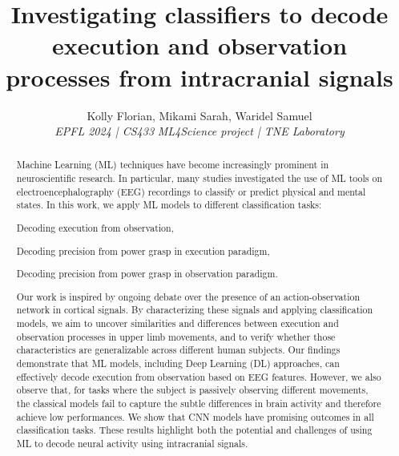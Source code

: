 \documentclass[10pt,conference,compsocconf]{IEEEtran}
\begin{document}
\title{Investigating classifiers to decode execution and observation processes from intracranial signals}

\author{
  Kolly Florian, Mikami Sarah, Waridel Samuel \\
  \textit{EPFL 2024 | CS433}
  \textit{ML4Science project | TNE Laboratory}
}

\maketitle

\begin{abstract}
    Machine Learning (ML) techniques have become increasingly prominent in neuroscientific research. In particular, many studies investigated the use of ML tools on electroencephalography (EEG) recordings to classify or predict physical and mental states. In this work, we apply ML models to different classification tasks:
    \begin{inlineroman}
        \item Decoding execution from observation,
        \item Decoding precision from power grasp in execution paradigm,
        \item Decoding precision from power grasp in observation paradigm.
    \end{inlineroman}
    Our work is inspired by ongoing debate over the presence of an action-observation network in cortical signals. By characterizing these signals and applying classification models, we aim to uncover similarities and differences between execution and observation processes in upper limb movements, and to verify whether those characteristics are generalizable across different human subjects. Our findings demonstrate that ML models, including Deep Learning (DL) approaches, can effectively decode execution from observation based on EEG features. However, we also observe that, for tasks where the subject is passively observing different movements, the classical models fail to capture the subtle differences in brain activity and therefore achieve low performances. We show that CNN models have promising outcomes in all classification tasks. These results highlight both the potential and challenges of using ML to decode neural activity using intracranial signals.

\end{abstract}
\end{document}
